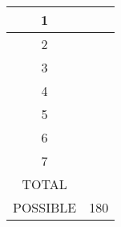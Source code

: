 \begin{titlepage}
{\begin{center}
\begin{tabular}{|c|l|}
\hline
\hspace{.05in} 1 \hspace{.05in} & \hspace{.5in} \mbox{ } \\ \hline
\hspace{.05in}  2 \hspace{.05in} & \hspace{.5in} \mbox{ } \\ \hline
\hspace{.05in}  3 \hspace{.05in} & \hspace{.5in} \mbox{ } \\ \hline
\hspace{.05in}  4 \hspace{.05in} & \hspace{.5in} \mbox{ } \\ \hline
\hspace{.05in}  5 \hspace{.05in} & \hspace{.5in} \mbox{ } \\ \hline
\hspace{.05in}  6 \hspace{.05in} & \hspace{.5in} \mbox{ } \\ \hline
\hspace{.05in}  7 \hspace{.05in} & \hspace{.5in} \mbox{ } \\ \hline


\hspace{.05in} TOTAL \hspace{.05in} & \hspace{.5in} \mbox{ } \\ \hline 
\hspace{.05in} POSSIBLE \hspace{.05in} & 180  \\ \hline 
\end{tabular} 


\end{center}}
\end{titlepage}
